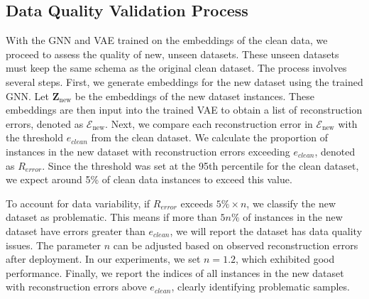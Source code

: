

\subsection{Data Quality Validation Process}

With the GNN and VAE trained on the embeddings of the clean data, we proceed to assess the quality of new, unseen datasets. These unseen datasets must keep the same schema as the original clean dataset. The process involves several steps.
First, we generate embeddings for the new dataset using the trained GNN. Let \( \mathbf{Z}_{\text{new}} \) be the embeddings of the new dataset instances. These embeddings are then input into the trained VAE to obtain a list of reconstruction errors, denoted as \(\mathcal{E}_{\text{new}}\).
Next, we compare each reconstruction error in \(\mathcal{E}_{\text{new}}\) with the threshold \( e_{clean} \) from the clean dataset. 
We calculate the proportion of instances in the new dataset with reconstruction errors exceeding \( e_{clean} \), denoted as \( R_{error} \). 
Since the threshold was set at the 95th percentile for the clean dataset, we expect around 5\% of clean data instances to exceed this value. 

To account for data variability, if \( R_{error} \) exceeds \( 5\% \times n \), we classify the new dataset as problematic. This means if more than \( 5n\% \) of instances in the new dataset have errors greater than \( e_{clean} \), we will report the dataset has data quality issues. The parameter \( n \) can be adjusted based on observed reconstruction errors after deployment.
In our experiments, we set \( n = 1.2 \), which exhibited good performance.
Finally, we report the indices of all instances in the new dataset with reconstruction errors above \( e_{clean} \), clearly identifying problematic samples.


